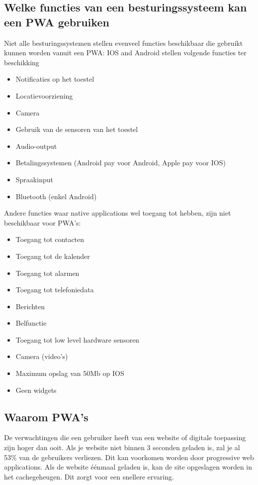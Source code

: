 \subsection{Welke functies van een besturingssysteem kan een PWA gebruiken}
Niet alle besturingssystemen stellen evenveel functies beschikbaar die gebruikt kunnen worden vanuit een PWA: IOS and Android stellen volgende functies ter beschikking
\begin{itemize}
    \item Notificaties op het toestel
    \item Locatievoorziening
    \item Camera
    \item Gebruik van de sensoren van het toestel
    \item Audio-output
    \item Betalingssystemen (Android pay voor Android, Apple pay voor IOS)
    \item Spraakinput
    \item Bluetooth (enkel Android)
\end{itemize}
Andere functies waar native applications wel toegang tot hebben, zijn niet beschikbaar voor PWA's:
\begin{itemize}
    \item Toegang tot contacten
    \item Toegang tot de kalender
    \item Toegang tot alarmen
    \item Toegang tot telefoniedata
    \item Berichten
    \item Belfunctie
    \item Toegang tot low level hardware sensoren
    \item Camera (video’s)
    \item Maximum opslag van 50Mb op IOS
    \item Geen widgets
\end{itemize}

\autocite{Malavolta2016}
\autocite{Destrebecq2018}

\subsection{Waarom PWA's}

De verwachtingen die een gebruiker heeft van een website of digitale toepassing zijn hoger dan ooit. Als je website niet binnen 3 seconden geladen is, zal je al 53\% van de gebruikers verliezen. Dit kan voorkomen worden door progressive web applications. Als de website éénmaal geladen is, kan de site opgeslagen worden in het cachegeheugen. Dit zorgt voor een snellere ervaring.
\autocite{Google2017}

